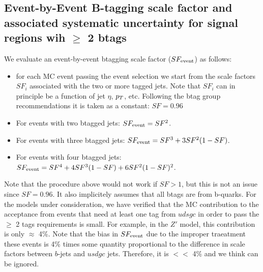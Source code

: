 \subsection{Event-by-Event B-tagging scale factor and 
associated systematic uncertainty for signal regions wih $\geq$ 2 btags}
\label{sec:SF2btag}

We evaluate an event-by-event btagging scale factor ($SF_{\rm event}$) as follows:

\begin{itemize}
\item for each MC event passing the event selection we start
from the scale factors $SF_i$ associated with the two or more
tagged jets.  Note that $SF_i$ can in principle be a function 
of jet $\eta$, $p_T$, etc.  Following the btag group 
recommendations
it is taken as a constant: $SF=0.96$\cite{BTV11003, btvSyst}


\item For events with two btagged jets: $SF_{\rm event}=SF^2$.

\item For events with three btagged jets: $SF_{\rm event}=SF^3 + 3SF^2(1-SF)$.

\item For events with four btagged jets: $SF_{\rm event}=SF^4 + 4SF^3(1-SF) + 6SF^2(1-SF)^2$.
\end{itemize}

Note that the procedure above would not work if $SF>1$, but this is not an issue
since $SF=0.96$.
It also implicitely assumes that all btags are from b-quarks.  For the models under 
consideration, we have verified that the MC contribution to the acceptance from 
events that need at least one tag from $udsgc$ in order to pass the $\ge$ 2 tags 
requirements is small.  For example, in the $Z'$ model, this contribution is
only $\approx$ 4\%.  Note that the bias in $SF_{\rm event}$ due to the improper traeatment
these events is 4\% times some quantity proportional to the difference in scale 
factors between $b$-jets and $usdgc$ jets.  Therefore, it is $<<$ 4\% and we think
can be ignored.  


